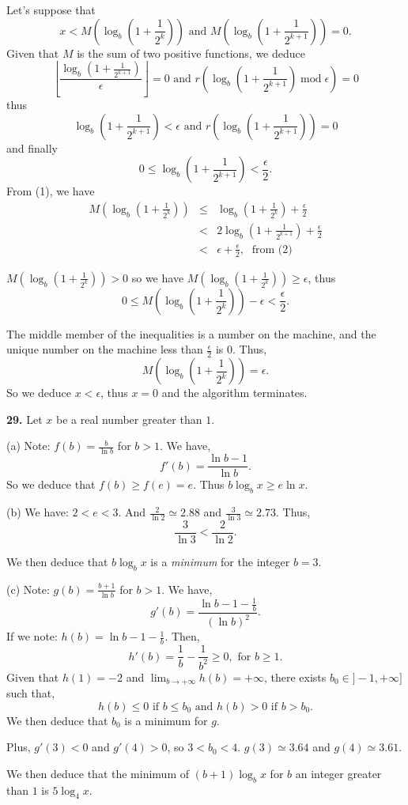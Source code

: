 \documentclass[a4paper,12pt]{article}
\newcommand{\newpar}[1]{\bigskip \noindent \textbf{#1.}}
\begin{document}
Let's suppose that
\[ x < M\left(\log_b\left(1 + \frac{1}{2^{k}}\right)\right) \mbox{ and }
M\left(\log_b\left(1 + \frac{1}{2^{k+1}}\right)\right) = 0.\]
Given that $M$ is the sum of two positive functions, we deduce
\[ \left\lfloor\frac{\log_b\left(1 + \frac{1}{2^{k+1}}\right)}{\epsilon}
\right\rfloor = 0 \mbox{ and }
r\left(\log_b\left(1 + \frac{1}{2^{k+1}}\right)\; \mathrm{mod} \; \epsilon
\right) = 0\]
thus
\[ \log_b\left(1 + \frac{1}{2^{k+1}}\right) < \epsilon \mbox{ and }
r\left(\log_b\left(1 + \frac{1}{2^{k+1}}\right)\right) = 0\]
and finally
\begin{equation}
0 \le \log_b\left(1 + \frac{1}{2^{k+1}}\right) < \frac{\epsilon}{2}.
\end{equation}
From (1), we have
\begin{eqnarray*}
M\left(\log_b\left(1 + \frac{1}{2^k}\right)\right) & \le &
\log_b\left(1 + \frac{1}{2^k}\right) + \frac{\epsilon}{2} \\ & < &
2 \log_b\left(1 + \frac{1}{2^{k+1}}\right) + \frac{\epsilon}{2} \\ & < &
\epsilon + \frac{\epsilon}{2},\; \mbox{ from (2)}
\end{eqnarray*}

$M\left(\log_b\left(1 + \frac{1}{2^k}\right)\right) > 0$ so we have
$M\left(\log_b\left(1 + \frac{1}{2^k}\right)\right) \ge \epsilon$, thus
\[ 0 \le M\left(\log_b\left(1 + \frac{1}{2^k}\right)\right)
- \epsilon < \frac{\epsilon}{2}.\]

The middle member of the inequalities is a number on the machine, and the unique
number on the machine less than $\frac{\epsilon}{2}$ is $0$. Thus,
\[ M\left(\log_b\left(1 + \frac{1}{2^k}\right)\right) = \epsilon.\]
So we deduce $x < \epsilon$, thus $x = 0$ and the algorithm terminates.

\newpar{29}  Let $x$ be a real number greater than $1$.

\noindent
(a) Note: $f(b) = \frac{b}{\ln b}$ for $b > 1$. We have,
\[f'(b) = \frac{\ln b - 1}{\ln b}.\]
So we deduce that $f(b) \ge f(e) = e$.  Thus $b \log_bx \ge e \ln x$.

\medskip \noindent
(b) We have: $2 < e < 3$.  And $\frac{2}{\ln 2} \simeq 2.88$ and
$\frac{3}{\ln 3} \simeq 2.73$. Thus,
\[ \frac{3}{\ln 3} < \frac{2}{\ln 2}.\]

We then deduce that $b \log_bx$ is a \emph{minimum} for the integer $b = 3$.

\medskip \noindent
(c) Note: $g(b) = \frac{b+1}{\ln b}$ for $b > 1$. We have,
\[ g'(b) = \frac{\ln b - 1 - \frac{1}{b}}{(\ln b)^2}.\]
If we note: $h(b) = \ln b - 1 - \frac{1}{b}$. Then,
\[ h'(b) = \frac{1}{b} - \frac{1}{b^2} \ge 0, \mbox{ for } b \ge 1.\]
Given that $h(1) = -2$ and $\lim_{b \rightarrow +\infty}h(b) = +\infty$, there
exists $b_0 \in \rbrack -1, +\infty\rbrack$ such that,
\[ h(b) \le 0 \mbox{ if } b \le b_0 \mbox{ and } h(b) > 0 \mbox{ if } b > b_0.\]
We then deduce that $b_0$ is a minimum for $g$.

Plus, $g'(3) < 0$ and $g'(4) > 0$,  so $3 < b_0 < 4$.
$g(3) \simeq 3.64$ and $g(4) \simeq 3.61$.

We then deduce that the minimum of $(b+1)\log_bx$ for $b$ an integer
greater than $1$ is $5 \log_4x$.
\end{document}
